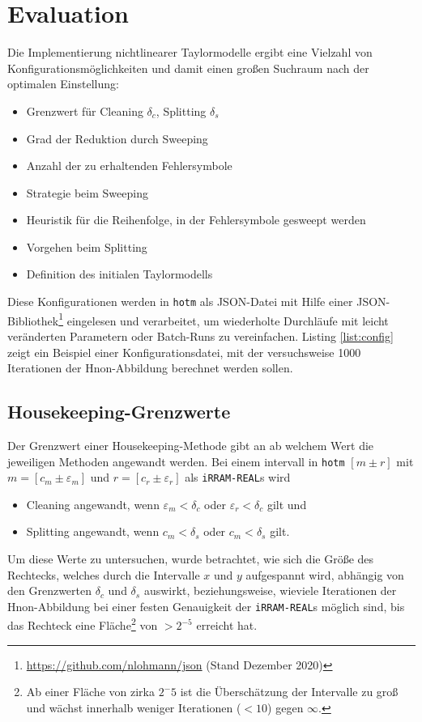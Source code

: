 
\chapter{Evaluation}
\label{ch:Evaluierung}

Die Implementierung nichtlinearer Taylormodelle ergibt eine Vielzahl von Konfigurationsmöglichkeiten und damit einen großen Suchraum nach der optimalen Einstellung:
\begin{itemize}
 \item Grenzwert für Cleaning $\delta_c$, Splitting $\delta_s$
 \item Grad der Reduktion durch Sweeping
 \item Anzahl der zu erhaltenden Fehlersymbole
 \item Strategie beim Sweeping
 \item Heuristik für die Reihenfolge, in der Fehlersymbole gesweept werden
 \item Vorgehen beim Splitting
 \item Definition des initialen Taylormodells
\end{itemize}
Diese Konfigurationen werden in \verb+hotm+ als JSON-Datei mit Hilfe einer JSON-Bibliothek\footnote{\url{https://github.com/nlohmann/json} (Stand Dezember 2020)} eingelesen und verarbeitet, um wiederholte Durchläufe mit leicht veränderten Parametern oder Batch-Runs zu vereinfachen. Listing \ref{list:config} zeigt ein Beispiel einer Konfigurationsdatei, mit der versuchsweise 1000 Iterationen der H\e non-Abbildung berechnet werden sollen. 



\section{Housekeeping-Grenzwerte}
Der Grenzwert einer Housekeeping-Methode gibt an ab welchem Wert die jeweiligen Methoden angewandt werden. Bei einem intervall in \verb+hotm+ $[m \pm r]$ mit $m = [c_m \pm \varepsilon_m]$ und $r = [c_r \pm \varepsilon_r]$ als \verb+iRRAM-REAL+s wird
\begin{itemize}
 \item Cleaning angewandt, wenn $\varepsilon_m < \delta_c$ oder $\varepsilon_r < \delta_c$ gilt und
 \item Splitting angewandt, wenn $c_m < \delta_s$ oder $c_m < \delta_s$ gilt.
\end{itemize}
Um diese Werte zu untersuchen, wurde betrachtet, wie sich die Größe des Rechtecks, welches durch die Intervalle $x$ und $y$ aufgespannt wird, abhängig von den Grenzwerten $\delta_c$ und $\delta_s$ auswirkt, beziehungsweise, wieviele Iterationen der H\e non-Abbildung bei einer festen Genauigkeit der \verb+iRRAM-REAL+s möglich sind, bis das Rechteck eine Fläche\footnote{Ab einer Fläche von zirka $2^-{5}$ ist die Überschätzung der Intervalle zu groß und wächst innerhalb weniger Iterationen ($< 10$) gegen $\infty$.} von $>2^{-5}$ erreicht hat.


